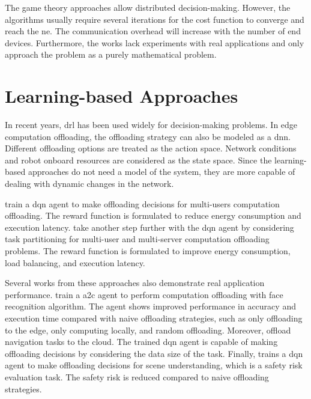 The game theory approaches allow distributed decision-making. However, the algorithms usually require several iterations for the cost function to converge and reach the \gls{ne}. The communication overhead will increase with the number of end devices. Furthermore, the works lack experiments with real applications and only approach the problem as a purely mathematical problem. 

\section{Learning-based Approaches}\label{sec:learning_based_approaches}

In recent years, \gls{drl} has been used widely for decision-making problems. In edge computation offloading, the offloading strategy can also be modeled as a \gls{dnn}. Different offloading options are treated as the action space. Network conditions and robot onboard resources are considered as the state space. Since the learning-based approaches do not need a model of the system, they are more capable of dealing with dynamic changes in the network. 

\citeauthor*{Huang2019} \cite{Huang2019} train a \gls{dqn} agent to make offloading decisions for multi-users computation offloading. The reward function is formulated to reduce energy consumption and execution latency. \citeauthor*{Lu2020} \cite{Lu2020} take another step further with the \gls{dqn} agent by considering task partitioning for multi-user and multi-server computation offloading problems. The reward function is formulated to improve energy consumption, load balancing, and execution latency. 

Several works from these approaches also demonstrate real application performance. \citeauthor*{Chinchali2019} \cite{Chinchali2019} train a \gls{a2c} agent to perform computation offloading with face recognition algorithm. The agent shows improved performance in accuracy and execution time compared with naive offloading strategies, such as only offloading to the edge, only computing locally, and random offloading. Moreover, \citeauthor*{Penmetcha2021} \cite{Penmetcha2021} offload navigation tasks to the cloud. The trained \gls{dqn} agent is capable of making offloading decisions by considering the data size of the task. Finally, \citeauthor*{Ruggeri2022} \cite{Ruggeri2022} trains a \gls{dqn} agent to make offloading decisions for scene understanding, which is a safety risk evaluation task. The safety risk is reduced compared to naive offloading strategies. 

